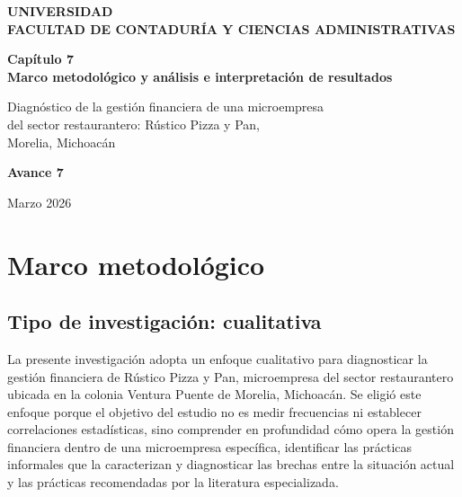 \documentclass[12pt,letterpaper]{article}
\begin{document}
\begin{titlepage}
\centering
\vspace*{3cm}

{\large\bfseries UNIVERSIDAD \\ [0.5em]
FACULTAD DE CONTADURÍA Y CIENCIAS ADMINISTRATIVAS}

\vspace{3cm}

{\Large\bfseries Capítulo 7 \\[0.5em]
Marco metodológico y análisis e interpretación de resultados}

\vspace{2cm}

{\large Diagnóstico de la gestión financiera de una microempresa \\
del sector restaurantero: Rústico Pizza y Pan, \\
Morelia, Michoacán}

\vspace{3cm}

{\large\bfseries Avance 7}

\vfill

{\large Marzo 2026}
\end{titlepage}

\setcounter{page}{2}

\section{Marco metodológico}

\subsection{Tipo de investigación: cualitativa}

La presente investigación adopta un enfoque cualitativo para diagnosticar la gestión financiera de Rústico Pizza y Pan, microempresa del sector restaurantero ubicada en la colonia Ventura Puente de Morelia, Michoacán. Se eligió este enfoque porque el objetivo del estudio no es medir frecuencias ni establecer correlaciones estadísticas, sino comprender en profundidad cómo opera la gestión financiera dentro de una microempresa específica, identificar las prácticas informales que la caracterizan y diagnosticar las brechas entre la situación actual y las prácticas recomendadas por la literatura especializada.
\end{document}
